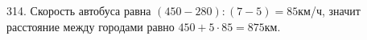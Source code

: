 314. Скорость автобуса равна $(450-280):(7-5)=85$км/ч, значит расстояние между городами равно $450+5\cdot85=875$км.\\
